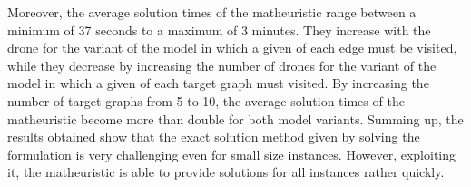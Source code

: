 Moreover, the average solution times of the matheuristic range between a minimum of 37 seconds to a maximum of 3 minutes. They increase with the drone  for the variant of the model in which a given  of each edge must be visited, while they decrease by increasing the number of drones for the variant of the model in which a given  of each target graph must  visited. By increasing the number of target graphs from 5 to 10, the average solution times of the matheuristic become more than double for both model variants.
Summing up, the results obtained show that the exact solution method given by solving the formulation is very challenging even for small size instances. However, exploiting it, the matheuristic is able to provide  solutions for all instances rather quickly.

